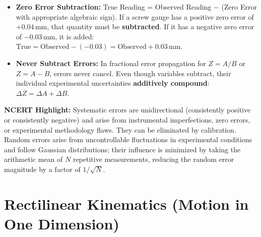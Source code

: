 \documentclass[10pt,twoside,openright]{book}
\begin{document}
\begin{trapbox}
\begin{itemize}
  \item \textbf{Zero Error Subtraction:} True Reading = Observed Reading $-$ (Zero Error with appropriate algebraic sign). If a screw gauge has a positive zero error of $+0.04\,\mathrm{mm}$, that quantity must be \textbf{subtracted}. If it has a negative zero error of $-0.03\,\mathrm{mm}$, it is added: $\text{True} = \text{Observed} - (-0.03) = \text{Observed} + 0.03\,\mathrm{mm}$.
  \item \textbf{Never Subtract Errors:} In fractional error propagation for $Z = A/B$ or $Z = A - B$, errors never cancel. Even though variables subtract, their individual experimental uncertainties \textbf{additively compound}: $\Delta Z = \Delta A + \Delta B$.
\end{itemize}
\end{trapbox}

\begin{ncertbox}
\textbf{NCERT Highlight:} Systematic errors are unidirectional (consistently positive or consistently negative) and arise from instrumental imperfections, zero errors, or experimental methodology flaws. They can be eliminated by calibration. Random errors arise from uncontrollable fluctuations in experimental conditions and follow Gaussian distributions; their influence is minimized by taking the arithmetic mean of $N$ repetitive measurements, reducing the random error magnitude by a factor of $1/\sqrt{N}$.
\end{ncertbox}

\section{Rectilinear Kinematics (Motion in One Dimension)}
\end{document}
